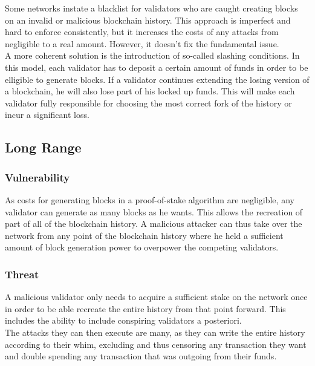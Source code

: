 \documentclass[11pt,a4paper,draft]{article}
\begin{document}
Some networks instate a blacklist for validators who are caught creating blocks on an invalid or malicious blockchain history. This approach is imperfect and hard to enforce consistently, but it increases the costs of any attacks from negligible to a real amount. However, it doesn't fix the fundamental issue.\\

A more coherent solution is the introduction of so-called slashing conditions. In this model, each validator has to deposit a certain amount of funds in order to be elligible to generate blocks. If a validator continues extending the losing version of a blockchain, he will also lose part of his locked up funds. This will make each validator fully responsible for choosing the most correct fork of the history or incur a significant loss.\\

\subsection{Long Range}

\subsubsection{Vulnerability}

As costs for generating blocks in a proof-of-stake algorithm are negligible, any validator can generate as many blocks as he wants. This allows the recreation of part of all of the blockchain history. A malicious attacker can thus take over the network from any point of the blockchain history where he held a sufficient amount of block generation power to overpower the competing validators.\\

\subsubsection{Threat}

A malicious validator only needs to acquire a sufficient stake on the network once in order to be able recreate the entire history from that point forward. This includes the ability to include conspiring validators a posteriori.\\

The attacks they can then execute are many, as they can write the entire history according to their whim, excluding and thus censoring any transaction they want and double spending any transaction that was outgoing from their funds.\\
\end{document}
